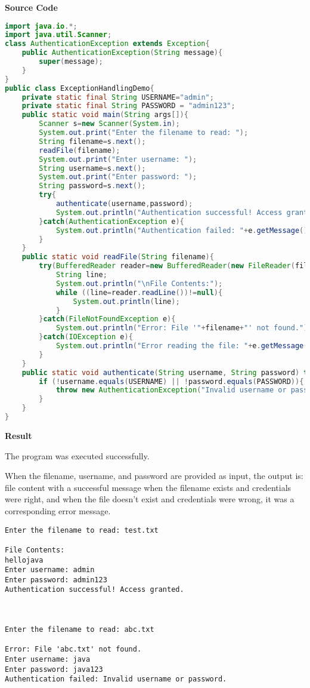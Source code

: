 \vspace{0.5cm}
\textbf{Source Code}

\begin{lstlisting}[language=Java]
import java.io.*;
import java.util.Scanner;
class AuthenticationException extends Exception{
	public AuthenticationException(String message){
		super(message);
	}
}
public class ExceptionHandlingDemo{
	private static final String USERNAME="admin";
	private static final String PASSWORD = "admin123";
	public static void main(String args[]){
		Scanner s=new Scanner(System.in);
		System.out.print("Enter the filename to read: ");
		String filename=s.next();
		readFile(filename);
		System.out.print("Enter username: ");
		String username=s.next();
		System.out.print("Enter password: ");
		String password=s.next();
		try{
			authenticate(username,password);
			System.out.println("Authentication successful! Access granted.");
		}catch(AuthenticationException e){
			System.out.println("Authentication failed: "+e.getMessage());
		}
	}
	public static void readFile(String filename){
		try(BufferedReader reader=new BufferedReader(new FileReader(filename))){
			String line;
			System.out.println("\nFile Contents:");
			while ((line=reader.readLine())!=null){
				System.out.println(line);
			}
		}catch(FileNotFoundException e){
			System.out.println("Error: File '"+filename+"' not found.");
		}catch(IOException e){
			System.out.println("Error reading the file: "+e.getMessage());
		}
	}
	public static void authenticate(String username, String password) throws AuthenticationException{
		if (!username.equals(USERNAME) || !password.equals(PASSWORD)){
			throw new AuthenticationException("Invalid username or password.");
		}
	}
}
\end{lstlisting}

\vspace{0.5cm}
\textbf{Result}
\vspace{0.5cm}

The program was executed successfully. 

When the filename, username, and password are provided as input, the output is: file content with a successful message when the filename exists and credentials were right, and when the file doesn't exist and credentials were wrong, it was a corresponding error message.
\begin{verbatim}
Enter the filename to read: test.txt

File Contents:
hellojava
Enter username: admin
Enter password: admin123
Authentication successful! Access granted.



Enter the filename to read: abc.txt

Error: File 'abc.txt' not found.
Enter username: java
Enter password: java123
Authentication failed: Invalid username or password.

\end{verbatim}

